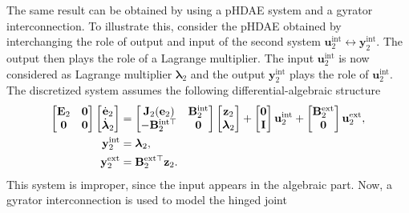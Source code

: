 The same result can be obtained by using a pHDAE system and a gyrator interconnection. To illustrate this, consider the pHDAE obtained by interchanging the role of output and input of the second system $\mathbf{u}_2^{\text{int}} \leftrightarrow \mathbf{y}_2^{\text{int}}$. The output then plays the role of a Lagrange multiplier. The input $\mathbf{u}_2^{\text{int}}$ is now considered as Lagrange multiplier ${\bm{\lambda}}_2$ and the output $\mathbf{y}_2^{\text{int}}$ plays the role of $\mathbf{u}_2^{\text{int}}$. The discretized system assumes the following differential-algebraic structure
\begin{equation}
\begin{aligned}
\begin{bmatrix}
\mathbf{E}_2 & \mathbf{0} \\
\mathbf{0} & \mathbf{0} \\
\end{bmatrix} \begin{bmatrix}
\dot{\mathbf{e}}_2 \\
\dot{\bm{\lambda}}_2 \\
\end{bmatrix}
&= \begin{bmatrix}
\mathbf{J}_2(\mathbf{e}_2) & \mathbf{B}_2^{\text{int}} \\
-\mathbf{B}_2^{\text{int} \top} & \mathbf{0}\\
\end{bmatrix} \begin{bmatrix}
\mathbf{z}_2 \\
{\bm{\lambda}}_2
\end{bmatrix} 
+ \begin{bmatrix}
\mathbf{0} \\
\mathbf{I}
\end{bmatrix} \mathbf{u}_2^{\text{int}} + \begin{bmatrix}
\mathbf{B}_2^{\text{ext}} \\
\mathbf{0} \\
\end{bmatrix} \mathbf{u}_2^{\text{ext}},  \vspace{2mm} \\
\mathbf{y}_2^{\text{int}} &= {\bm{\lambda}}_2, \\
\mathbf{y}_2^{\text{ext}} &= \mathbf{B}_2^{\text{ext} \top} \mathbf{z}_2.
\end{aligned}
\end{equation}
This system is improper, since the input appears in the algebraic part. Now, a gyrator interconnection is used to model the hinged joint
